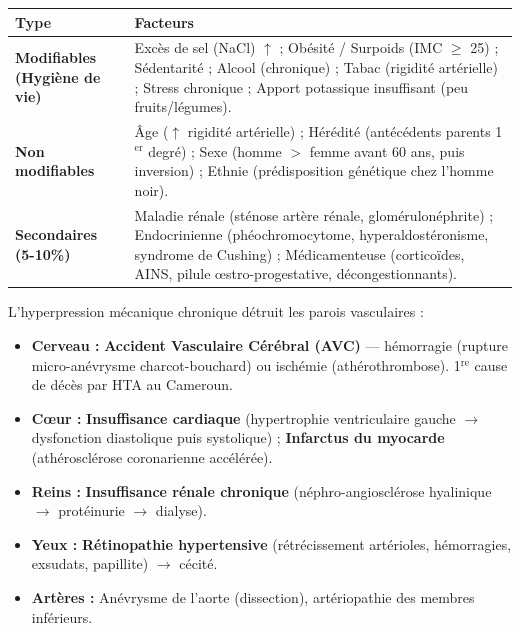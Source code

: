 \documentclass[11pt]{article}
\begin{document}
\begin{aretenir}
\begin{center}
\begin{tabularx}{\linewidth}{|l|X|}\hline
\textbf{Type} & \textbf{Facteurs} \\ \hline
\textbf{Modifiables (Hygiène de vie)} & Excès de sel (NaCl) $\uparrow$ ; Obésité / Surpoids (IMC $\ge$ 25) ; Sédentarité ; Alcool (chronique) ; Tabac (rigidité artérielle) ; Stress chronique ; Apport potassique insuffisant (peu fruits/légumes). \\ \hline
\textbf{Non modifiables} & Âge ($\uparrow$ rigidité artérielle) ; Hérédité (antécédents parents 1$^{\text{er}}$ degré) ; Sexe (homme $>$ femme avant 60 ans, puis inversion) ; Ethnie (prédisposition génétique chez l'homme noir). \\ \hline
\textbf{Secondaires (5-10\%)} & Maladie rénale (sténose artère rénale, glomérulonéphrite) ; Endocrinienne (phéochromocytome, hyperaldostéronisme, syndrome de Cushing) ; Médicamenteuse (corticoïdes, AINS, pilule œstro-progestative, décongestionnants). \\ \hline
\end{tabularx}
\end{center}
\end{aretenir}

\begin{propriete}
L'hyperpression mécanique chronique détruit les parois vasculaires :
\begin{itemize}
    \item \textbf{Cerveau :} \textbf{Accident Vasculaire Cérébral (AVC)} — hémorragie (rupture micro-anévrysme charcot-bouchard) ou ischémie (athérothrombose). 1$^{\text{re}}$ cause de décès par HTA au Cameroun.
    \item \textbf{Cœur :} \textbf{Insuffisance cardiaque} (hypertrophie ventriculaire gauche $\rightarrow$ dysfonction diastolique puis systolique) ; \textbf{Infarctus du myocarde} (athérosclérose coronarienne accélérée).
    \item \textbf{Reins :} \textbf{Insuffisance rénale chronique} (néphro-angiosclérose hyalinique $\rightarrow$ protéinurie $\rightarrow$ dialyse).
    \item \textbf{Yeux :} \textbf{Rétinopathie hypertensive} (rétrécissement artérioles, hémorragies, exsudats, papillite) $\rightarrow$ cécité.
    \item \textbf{Artères :} Anévrysme de l'aorte (dissection), artériopathie des membres inférieurs.
\end{itemize}
\end{propriete}
\end{document}
